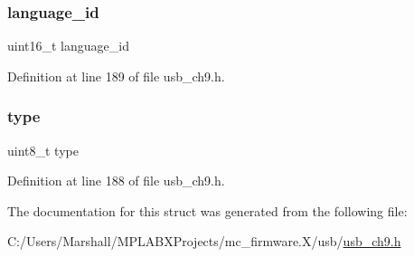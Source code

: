 \subsubsection{\texorpdfstring{language\_id}{language\_id}}
{\footnotesize\ttfamily uint16\+\_\+t language\+\_\+id}



Definition at line 189 of file usb\+\_\+ch9.\+h.

\mbox{\label{struct_d_e_s_c_r_i_p_t_o_r___i_d_a1d127017fb298b889f4ba24752d08b8e}} 
\subsubsection{\texorpdfstring{type}{type}}
{\footnotesize\ttfamily uint8\+\_\+t type}



Definition at line 188 of file usb\+\_\+ch9.\+h.



The documentation for this struct was generated from the following file\+:\begin{DoxyCompactItemize}
\item 
C\+:/\+Users/\+Marshall/\+M\+P\+L\+A\+B\+X\+Projects/mc\+\_\+firmware.\+X/usb/\mbox{\hyperlink{usb__ch9_8h}{usb\+\_\+ch9.\+h}}\end{DoxyCompactItemize}
